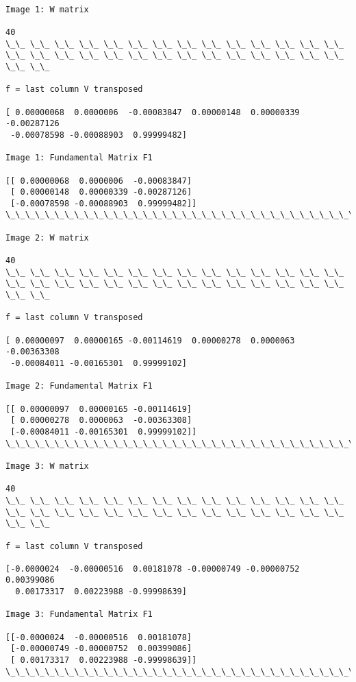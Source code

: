\documentclass[11pt]{article}
\begin{document}
    \begin{Verbatim}[commandchars=\\\{\}]

Image 1: W matrix

40
\_\_ \_\_ \_\_ \_\_ \_\_ \_\_ \_\_ \_\_ \_\_ \_\_ \_\_ \_\_ \_\_ \_\_ \_\_ \_\_ \_\_ \_\_ \_\_ \_\_ \_\_ \_\_ \_\_ \_\_ \_\_ \_\_ \_\_ \_\_ \_\_ \_\_

f = last column V transposed 

[ 0.00000068  0.0000006  -0.00083847  0.00000148  0.00000339 -0.00287126
 -0.00078598 -0.00088903  0.99999482]

Image 1: Fundamental Matrix F1

[[ 0.00000068  0.0000006  -0.00083847]
 [ 0.00000148  0.00000339 -0.00287126]
 [-0.00078598 -0.00088903  0.99999482]]
\_\_\_\_\_\_\_\_\_\_\_\_\_\_\_\_\_\_\_\_\_\_\_\_\_\_\_\_\_\_\_\_\_\_\_\_\_\_\_\_\_\_\_\_\_\_\_\_\_\_\_\_\_\_\_\_\_\_\_\_\_\_\_\_\_\_\_\_\_\_\_\_\_\_\_\_\_\_\_\_\_\_\_\_

Image 2: W matrix

40
\_\_ \_\_ \_\_ \_\_ \_\_ \_\_ \_\_ \_\_ \_\_ \_\_ \_\_ \_\_ \_\_ \_\_ \_\_ \_\_ \_\_ \_\_ \_\_ \_\_ \_\_ \_\_ \_\_ \_\_ \_\_ \_\_ \_\_ \_\_ \_\_ \_\_

f = last column V transposed 

[ 0.00000097  0.00000165 -0.00114619  0.00000278  0.0000063  -0.00363308
 -0.00084011 -0.00165301  0.99999102]

Image 2: Fundamental Matrix F1

[[ 0.00000097  0.00000165 -0.00114619]
 [ 0.00000278  0.0000063  -0.00363308]
 [-0.00084011 -0.00165301  0.99999102]]
\_\_\_\_\_\_\_\_\_\_\_\_\_\_\_\_\_\_\_\_\_\_\_\_\_\_\_\_\_\_\_\_\_\_\_\_\_\_\_\_\_\_\_\_\_\_\_\_\_\_\_\_\_\_\_\_\_\_\_\_\_\_\_\_\_\_\_\_\_\_\_\_\_\_\_\_\_\_\_\_\_\_\_\_

Image 3: W matrix

40
\_\_ \_\_ \_\_ \_\_ \_\_ \_\_ \_\_ \_\_ \_\_ \_\_ \_\_ \_\_ \_\_ \_\_ \_\_ \_\_ \_\_ \_\_ \_\_ \_\_ \_\_ \_\_ \_\_ \_\_ \_\_ \_\_ \_\_ \_\_ \_\_ \_\_

f = last column V transposed 

[-0.0000024  -0.00000516  0.00181078 -0.00000749 -0.00000752  0.00399086
  0.00173317  0.00223988 -0.99998639]

Image 3: Fundamental Matrix F1

[[-0.0000024  -0.00000516  0.00181078]
 [-0.00000749 -0.00000752  0.00399086]
 [ 0.00173317  0.00223988 -0.99998639]]
\_\_\_\_\_\_\_\_\_\_\_\_\_\_\_\_\_\_\_\_\_\_\_\_\_\_\_\_\_\_\_\_\_\_\_\_\_\_\_\_\_\_\_\_\_\_\_\_\_\_\_\_\_\_\_\_\_\_\_\_\_\_\_\_\_\_\_\_\_\_\_\_\_\_\_\_\_\_\_\_\_\_\_\_


\end{Verbatim}
\end{document}
